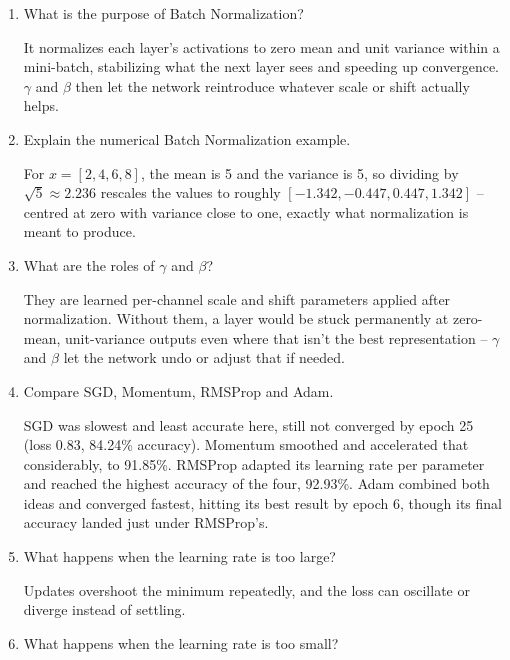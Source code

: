 \documentclass[10pt]{article}
\begin{document}
\begin{enumerate}
It randomly zeroes a fraction of neurons on each forward pass during
training, so the network can't lean on any single neuron or a fixed group of
neurons to solve the problem. On the test set, dropout is disabled and all
neurons fire at reduced strength, forcing the model to learn more robust,
co-adapted feature combinations instead of narrow ones tuned to specific training examples.

\item What is the purpose of Batch Normalization?

It normalizes each layer's activations to zero mean and unit variance within
a mini-batch, stabilizing what the next layer sees and speeding up
convergence. $\gamma$ and $\beta$ then let the network reintroduce whatever
scale or shift actually helps.

\item Explain the numerical Batch Normalization example.

For $x=[2,4,6,8]$, the mean is 5 and the variance is 5, so dividing by
$\sqrt{5}\approx2.236$ rescales the values to roughly
$[-1.342,-0.447,0.447,1.342]$ -- centred at zero with variance close to one,
exactly what normalization is meant to produce.

\item What are the roles of $\gamma$ and $\beta$?

They are learned per-channel scale and shift parameters applied after
normalization. Without them, a layer would be stuck permanently at zero-mean,
unit-variance outputs even where that isn't the best representation --
$\gamma$ and $\beta$ let the network undo or adjust that if needed.

\item Compare SGD, Momentum, RMSProp and Adam.

SGD was slowest and least accurate here, still not converged by epoch 25
(loss 0.83, 84.24\% accuracy). Momentum smoothed and accelerated that
considerably, to 91.85\%. RMSProp adapted its learning rate per parameter and
reached the highest accuracy of the four, 92.93\%. Adam combined both ideas
and converged fastest, hitting its best result by epoch 6, though its final
accuracy landed just under RMSProp's.

\item What happens when the learning rate is too large?

Updates overshoot the minimum repeatedly, and the loss can oscillate or
diverge instead of settling.

\item What happens when the learning rate is too small?


\end{enumerate}
\end{document}
